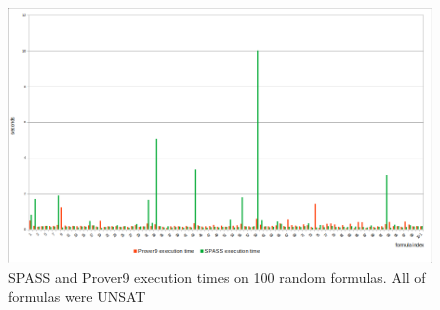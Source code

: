 \begin{figure}[ht]
\begin{centering}
  \includegraphics[width=\textwidth]{logic-formula-generator/dataset_analysis/execution_times.png}
  \caption{SPASS and Prover9 execution times on 100 random formulas. All of formulas were UNSAT}
\end{centering}
\end{figure}

